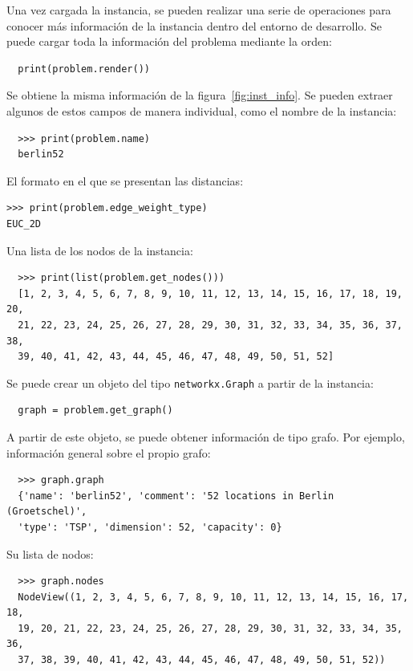 Una vez cargada la instancia, se pueden realizar una serie de operaciones para conocer más información de la instancia dentro 
del entorno de desarrollo. Se puede cargar toda la información del problema mediante la orden:

\begin{verbatim}
  print(problem.render())
\end{verbatim}

Se obtiene la misma información de la figura~\ref{fig:inst_info}. Se pueden extraer algunos de estos campos de manera individual,
como el nombre de la instancia:

\begin{verbatim}
  >>> print(problem.name)
  berlin52
\end{verbatim}

El formato en el que se presentan las distancias:

\begin{verbatim}
>>> print(problem.edge_weight_type)  
EUC_2D
\end{verbatim}

Una lista de los nodos de la instancia:

\begin{verbatim}
  >>> print(list(problem.get_nodes()))
  [1, 2, 3, 4, 5, 6, 7, 8, 9, 10, 11, 12, 13, 14, 15, 16, 17, 18, 19, 20, 
  21, 22, 23, 24, 25, 26, 27, 28, 29, 30, 31, 32, 33, 34, 35, 36, 37, 38, 
  39, 40, 41, 42, 43, 44, 45, 46, 47, 48, 49, 50, 51, 52]
\end{verbatim}

Se puede crear un objeto del tipo \texttt{networkx.Graph} a partir de la instancia:

\begin{verbatim}
  graph = problem.get_graph()
\end{verbatim}

A partir de este objeto, se puede obtener información de tipo grafo. Por ejemplo, información general sobre el propio grafo:

\begin{verbatim}
  >>> graph.graph
  {'name': 'berlin52', 'comment': '52 locations in Berlin (Groetschel)', 
  'type': 'TSP', 'dimension': 52, 'capacity': 0} 
\end{verbatim}

Su lista de nodos:

\begin{verbatim}
  >>> graph.nodes
  NodeView((1, 2, 3, 4, 5, 6, 7, 8, 9, 10, 11, 12, 13, 14, 15, 16, 17, 18,
  19, 20, 21, 22, 23, 24, 25, 26, 27, 28, 29, 30, 31, 32, 33, 34, 35, 36, 
  37, 38, 39, 40, 41, 42, 43, 44, 45, 46, 47, 48, 49, 50, 51, 52))
\end{verbatim}

